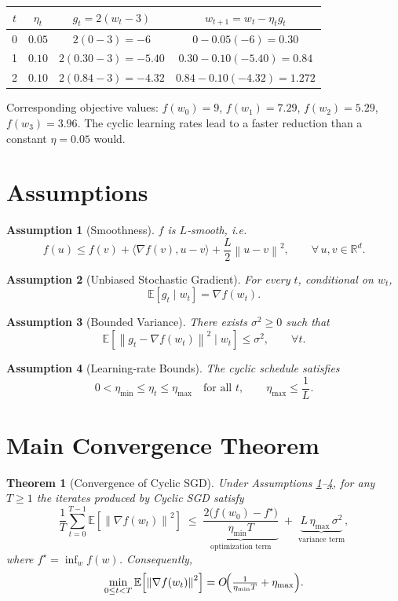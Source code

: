 \documentclass{article}
\newtheorem{theorem}{Theorem}
\newtheorem{assumption}{Assumption}
\newcommand{\EE}{\mathbb{E}}
\newcommand{\RR}{\mathbb{R}}
\newcommand{\norm}[1]{\left\|#1\right\|}
\begin{document}
\begin{center}
\begin{tabular}{c|c|c|c}
$t$ & $\eta_t$ & $g_t=2(w_t-3)$ & $w_{t+1}=w_t-\eta_t g_t$ \\ \hline
0 & $0.05$ & $2(0-3)=-6$ & $0-0.05(-6)=0.30$ \\
1 & $0.10$ & $2(0.30-3)=-5.40$ & $0.30-0.10(-5.40)=0.84$ \\
2 & $0.10$ & $2(0.84-3)=-4.32$ & $0.84-0.10(-4.32)=1.272$ 
\end{tabular}
\end{center}
Corresponding objective values:
$f(w_0)=9$, $f(w_1)=7.29$, $f(w_2)=5.29$, $f(w_3)=3.96$.
The cyclic learning rates lead to a faster reduction than a constant $\eta=0.05$ would.

\newpage

\section*{Assumptions}
\begin{assumption}[Smoothness]\label{as:smooth}
$f$ is $L$‑smooth, i.e.
\[
f(u)\le f(v)+\langle\nabla f(v),u-v\rangle+\frac{L}{2}\norm{u-v}^2,
\qquad\forall\,u,v\in\RR^{d}.
\tag{A1}
\]
\end{assumption}
\begin{assumption}[Unbiased Stochastic Gradient]\label{as:unbiased}
For every $t$, conditional on $w_t$,
\[
\EE\!\left[g_t\mid w_t\right]=\nabla f(w_t).
\tag{A2}
\]
\end{assumption}
\begin{assumption}[Bounded Variance]\label{as:variance}
There exists $\sigma^2\ge0$ such that
\[
\EE\!\left[\norm{g_t-\nabla f(w_t)}^2\mid w_t\right]\le\sigma^2,
\qquad\forall t.
\tag{A3}
\]
\end{assumption}
\begin{assumption}[Learning‑rate Bounds]\label{as:lr}
The cyclic schedule satisfies
\[
0<\eta_{\min}\le\eta_t\le\eta_{\max}\quad\text{for all }t,
\qquad 
\eta_{\max}\le\frac{1}{L}.
\tag{A4}
\]
\end{assumption}

\section*{Main Convergence Theorem}
\begin{theorem}[Convergence of Cyclic SGD]\label{thm:main}
Under Assumptions \ref{as:smooth}–\ref{as:lr}, for any $T\ge1$ the iterates produced by
Cyclic SGD satisfy
\[
\frac{1}{T}\sum_{t=0}^{T-1}\EE\!\left[\norm{\nabla f(w_t)}^2\right]
\;\le\;
\underbrace{\frac{2\bigl(f(w_0)-f^{\star}\bigr)}{\eta_{\min} T}}_{\text{optimization term}}
\;+\;
\underbrace{L\,\eta_{\max}\,\sigma^2}_{\text{variance term}},
\tag{3}
\]
where $f^{\star}=\inf_{w}f(w)$.
Consequently,
\[
\min_{0\le t<T}\EE\!\left[\norm{\nabla f(w_t)}^2\right]
=O\!\Bigl(\tfrac{1}{\eta_{\min}T}+\eta_{\max}\Bigr).
\]
\end{theorem}
\end{document}
